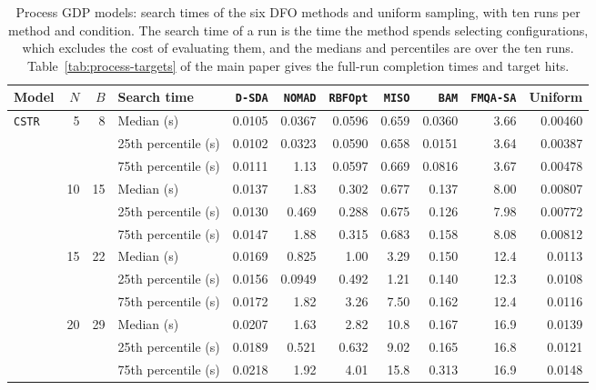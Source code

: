 \begin{table}[p]
\centering
\caption{Process GDP models: search times of the six DFO methods and uniform sampling, with ten runs per method and condition.
The search time of a run is the time the method spends selecting configurations, which excludes the cost of evaluating them, and the medians and percentiles are over the ten runs.
Table~\ifdefined\manuscriptwithsupplement\ref{tab:process-targets}\fi{} of the main paper gives the full-run completion times and target hits.}
\label{tab:process-search}
\footnotesize
\setlength{\tabcolsep}{3.5pt}
\begin{threeparttable}
\begin{tabular}{@{}lrrlrrrrrrr@{}}\toprule
Model & \(N\) & \(B\) & Search time & \texttt{D-SDA} & \texttt{NOMAD} & \texttt{RBFOpt} & \texttt{MISO} & \texttt{BAM} & \texttt{FMQA-SA} & Uniform \\\midrule
\multirow{18}{*}{\texttt{CSTR}} & \multirow{3}{*}{5} & \multirow{3}{*}{8} & Median (s) & 0.0105 & 0.0367 & 0.0596 & 0.659 & 0.0360 & 3.66 & 0.00460 \\
 & &  & 25th percentile (s) & 0.0102 & 0.0323 & 0.0590 & 0.658 & 0.0151 & 3.64 & 0.00387 \\
 & &  & 75th percentile (s) & 0.0111 & 1.13 & 0.0597 & 0.669 & 0.0816 & 3.67 & 0.00478 \\
 & \multirow{3}{*}{10} & \multirow{3}{*}{15} & Median (s) & 0.0137 & 1.83 & 0.302 & 0.677 & 0.137 & 8.00 & 0.00807 \\
 & &  & 25th percentile (s) & 0.0130 & 0.469 & 0.288 & 0.675 & 0.126 & 7.98 & 0.00772 \\
 & &  & 75th percentile (s) & 0.0147 & 1.88 & 0.315 & 0.683 & 0.158 & 8.08 & 0.00812 \\
 & \multirow{3}{*}{15} & \multirow{3}{*}{22} & Median (s) & 0.0169 & 0.825 & 1.00 & 3.29 & 0.150 & 12.4 & 0.0113 \\
 & &  & 25th percentile (s) & 0.0156 & 0.0949 & 0.492 & 1.21 & 0.140 & 12.3 & 0.0108 \\
 & &  & 75th percentile (s) & 0.0172 & 1.82 & 3.26 & 7.50 & 0.162 & 12.4 & 0.0116 \\
 & \multirow{3}{*}{20} & \multirow{3}{*}{29} & Median (s) & 0.0207 & 1.63 & 2.82 & 10.8 & 0.167 & 16.9 & 0.0139 \\
 & &  & 25th percentile (s) & 0.0189 & 0.521 & 0.632 & 9.02 & 0.165 & 16.8 & 0.0121 \\
 & &  & 75th percentile (s) & 0.0218 & 1.92 & 4.01 & 15.8 & 0.313 & 16.9 & 0.0148 \\

\end{tabular}
\end{threeparttable}
\end{table}
